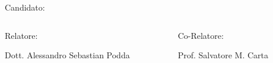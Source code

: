 \setlength{\parskip}{0pt}
\vspace{2.4em}
\begin{center}
    \inserttitle
\end{center}

\vspace{.3em}

\begin{center}
    {
    \small
    Candidato:

    }
    {
    \insertauthor
    }
\end{center}

\begin{center}
    \insertinstitute
\end{center}

\vspace{1.2em}

\begin{columns}
    \small
    \begin{column}{.5\textwidth}
        \centering
        {
            Relatore:
        }

        Dott. Alessandro Sebastian Podda

    \end{column}
    \begin{column}{.5\textwidth}
        \centering
        {
            Co-Relatore:
        }

        Prof. Salvatore M. Carta
    \end{column}
\end{columns}

\vspace{2.4em}

\begin{center}
    \insertdate
\end{center}
